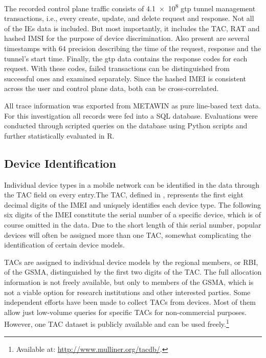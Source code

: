 The recorded control plane traffic consists of \num{4.1e8} \gls{gtp} tunnel management transactions, i.e., every create, update, and delete request and response. Not all of the \glspl{IE} data is included. But most importantly, it includes the \gls{TAC}, \gls{RAT} and hashed \gls{IMSI} for the purpose of device discrimination. Also present are several timestamps with \SI{64}{\bit} precision describing the time of the request, response and the tunnel's start time. Finally, the \gls{gtp} data contains the response codes for each request. With these codes, failed transactions can be distinguished from successful ones and examined separately. Since the hashed \gls{IMEI} is consistent across the user and control plane data, both can be cross-correlated.

All trace information was exported from \gls{METAWIN} as pure line-based text data. For this investigation all records were fed into a \acrshort{SQL} database. Evaluations were conducted through scripted queries on the database using Python scripts and further statistically evaluated in R.

\subsection{Device Identification}

Individual device types in a mobile network can be identified in the data through the \gls{TAC} field on every entry.The \gls{TAC}, defined in \cite{3gpp.23.003}, represents the first eight decimal digits of the \gls{IMEI} and uniquely identifies each device type. The following six digits of the \gls{IMEI} constitute the serial number of a specific device, which is of course omitted in the data. Due to the short length of this serial number, popular devices will often be assigned more than one \gls{TAC}, somewhat complicating the identification of certain device models.

\glspl{TAC} are assigned to individual device models by the regional members, or \gls{RBI}, of the \gls{GSMA}, distinguished by the first two digits of the \gls{TAC}. The full allocation information is not freely available, but only to members of the \gls{GSMA}, which is not a viable option for research institutions and other interested parties. Some independent efforts have been made to collect \glspl{TAC} from devices. Most of them allow just low-volume queries for specific \glspl{TAC} for non-commercial purposes. However, one \gls{TAC} dataset is publicly available and can be used freely.\footnote{Available at: \url{http://www.mulliner.org/tacdb/}.}

